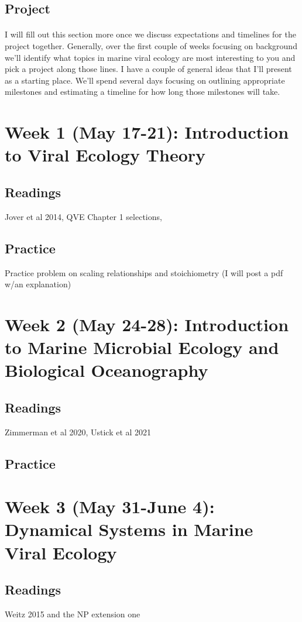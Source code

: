 \documentclass[11pt]{amsart}
\begin{document}
\subsection{Project} 
\paragraph{} I will fill out this section more once we discuss expectations and timelines for the project together. Generally, over the first couple of weeks focusing on background we'll identify what topics in marine viral ecology are most interesting to you and pick a project along those lines. I have a couple of general ideas that I'll present as a starting place. We'll spend several days focusing on outlining appropriate milestones and estimating a timeline for how long those milestones will take. 
\section{Week 1 (May 17-21): Introduction to Viral Ecology Theory}
\subsection{Readings} Jover et al 2014, QVE Chapter 1 selections, 
\subsection{Practice} Practice problem on scaling relationships and stoichiometry (I will post a pdf w/an explanation)
\section{Week 2 (May 24-28): Introduction to Marine Microbial Ecology and Biological Oceanography}
\subsection{Readings} Zimmerman et al 2020, Ustick et al 2021
\subsection{Practice}
\section{Week 3 (May 31-June 4): Dynamical Systems in Marine Viral Ecology}
\subsection{Readings} Weitz 2015 and the NP extension one
\end{document}
